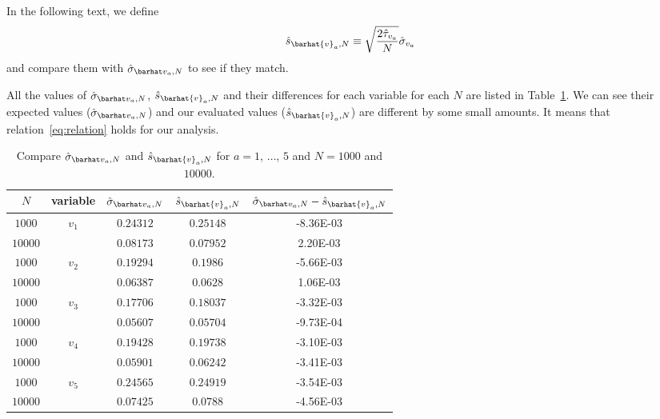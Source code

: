 In the following text, we define
%
\begin{equation}
    \hat{s}_{\barhat{v}_a,N} \equiv \sqrt{\frac{ 2 \hat{\tau}_{v_a} }{ N }} \hat{\sigma}_{v_a}
\end{equation}
%
and compare them with \(\sgbar{a}\) to see if they match.

All the values of \(\sgbar{a}\), \(\hat{s}_{\barhat{v}_a,N}\) and their differences
for each variable for each \(N\) are listed in Table~\ref{tab:s}.
We can see their expected values (\(\sgbar{a}\)) and our evaluated values
(\(\hat{s}_{\barhat{v}_a,N}\)) are different by some small amounts.
It means that relation~\eqref{eq:relation} holds for our analysis.

\begin{table}[H]
    \centering
    \caption{Compare \(\sgbar{a}\) and \(\hat{s}_{\barhat{v}_a,N}\) for
    \(a = 1\), \(\ldots\), \(5\) and \(N = 1000\) and \(10000\).}
    \label{tab:s}
    \begin{tabular}{@{}ccccc@{}}
        \toprule
        \(N\)     & variable                 & \(\sgbar{a}\) & \(\hat{s}_{\barhat{v}_a,N}\) & \(\sgbar{a}-\hat{s}_{\barhat{v}_a,N}\) \\
        \midrule
        \(1000\)  & \multirow{2}{*}{\(v_1\)} & \(0.24312\)   & \(0.25148\)                  & \num{-8.36E-03}                        \\
        \(10000\) &                          & \(0.08173\)   & \(0.07952\)                  & \num{2.20E-03}                         \\
        \cmidrule{1-2}
        \(1000\)  & \multirow{2}{*}{\(v_2\)} & \(0.19294\)   & \(0.1986\)                   & \num{-5.66E-03}                        \\
        \(10000\) &                          & \(0.06387\)   & \(0.0628\)                   & \num{1.06E-03}                         \\
        \cmidrule{1-2}
        \(1000\)  & \multirow{2}{*}{\(v_3\)} & \(0.17706\)   & \(0.18037\)                  & \num{-3.32E-03}                        \\
        \(10000\) &                          & \(0.05607\)   & \(0.05704\)                  & \num{-9.73E-04}                        \\
        \cmidrule{1-2}
        \(1000\)  & \multirow{2}{*}{\(v_4\)} & \(0.19428\)   & \(0.19738\)                  & \num{-3.10E-03}                        \\
        \(10000\) &                          & \(0.05901\)   & \(0.06242\)                  & \num{-3.41E-03}                        \\
        \cmidrule{1-2}
        \(1000\)  & \multirow{2}{*}{\(v_5\)} & \(0.24565\)   & \(0.24919\)                  & \num{-3.54E-03}                        \\
        \(10000\) &                          & \(0.07425\)   & \(0.0788\)                   & \num{-4.56E-03}                        \\
        \bottomrule
    \end{tabular}
\end{table}

